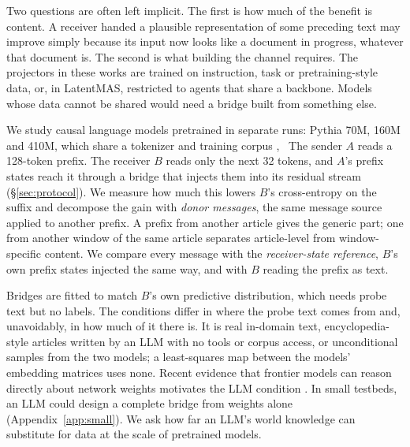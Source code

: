 Two questions are often left implicit. The first is how much of the benefit is content. A receiver handed a plausible representation of some preceding text may improve simply because its input now looks like a document in progress, whatever that document is. The second is what building the channel requires. The projectors in these works are trained on instruction, task or pretraining-style data, or, in LatentMAS, restricted to agents that share a backbone. Models whose data cannot be shared would need a bridge built from something else.

We study causal language models pretrained in separate runs: Pythia 70M, 160M and 410M, which share a tokenizer and training corpus \citep{biderman2023pythia}, \XFAMILYINTRO\ The sender $A$ reads a 128-token prefix. The receiver $B$ reads only the next 32 tokens, and $A$'s prefix states reach it through a bridge that injects them into its residual stream (\S\ref{sec:protocol}). We measure how much this lowers $B$'s cross-entropy on the suffix and decompose the gain with \emph{donor messages}, the same message source applied to another prefix. A prefix from another article gives the generic part; one from another window of the same article separates article-level from window-specific content. We compare every message with the \emph{receiver-state reference}, $B$'s own prefix states injected the same way, and with $B$ reading the prefix as text.

Bridges are fitted to match $B$'s own predictive distribution, which needs probe text but no labels. The conditions differ in where the probe text comes from and, unavoidably, in how much of it there is. It is real in-domain text, encyclopedia-style articles written by an LLM with no tools or corpus access, or unconditional samples from the two models; a least-squares map between the models' embedding matrices uses none. Recent evidence that frontier models can reason directly about network weights motivates the LLM condition \citep{takehi2026sparks}. In small testbeds, an LLM could design a complete bridge from weights alone (Appendix~\ref{app:small}). We ask how far an LLM's world knowledge can substitute for data at the scale of pretrained models.

